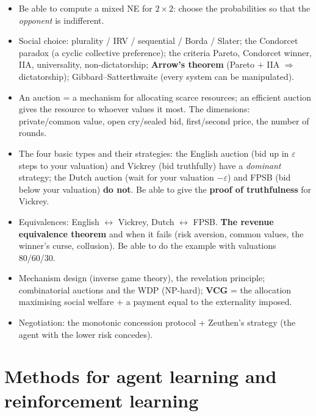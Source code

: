 \documentclass[11pt,a4paper]{article}
\theoremstyle{definition}
\begin{document}
\begin{itemize}
  the only non-Pareto-optimal outcome; $(C,C)$ maximises social welfare. The tragedy of the
  commons. The iterated PD, the shadow of the future, Axelrod and TFT (nice, retaliating,
  forgiving, non-envious, clear).
\item Be able to compute a mixed NE for $2\times2$: choose the probabilities so that the
  \emph{opponent} is indifferent.
\item Social choice: plurality / IRV / sequential / Borda / Slater; the Condorcet paradox
  (a cyclic collective preference); the criteria Pareto, Condorcet winner, IIA, universality,
  non-dictatorship; \textbf{Arrow's theorem} (Pareto + IIA $\Rightarrow$ dictatorship);
  Gibbard--Satterthwaite (every system can be manipulated).
\item An auction = a mechanism for allocating scarce resources; an efficient auction gives the
  resource to whoever values it most. The dimensions: private/common value, open cry/sealed bid,
  first/second price, the number of rounds.
\item The four basic types and their strategies: the English auction (bid up in $\varepsilon$
  steps to your valuation) and Vickrey (bid truthfully) have a \emph{dominant} strategy;
  the Dutch auction (wait for your valuation $-\varepsilon$) and FPSB (bid below your valuation)
  \textbf{do not}. Be able to give the \textbf{proof of truthfulness} for Vickrey.
\item Equivalences: English $\leftrightarrow$ Vickrey, Dutch $\leftrightarrow$ FPSB.
  \textbf{The revenue equivalence theorem} and when it fails (risk aversion, common values, the
  winner's curse, collusion). Be able to do the example with valuations 80/60/30.
\item Mechanism design (inverse game theory), the revelation principle; combinatorial auctions
  and the WDP (NP-hard); \textbf{VCG} = the allocation maximising social welfare + a payment
  equal to the externality imposed.
\item Negotiation: the monotonic concession protocol + Zeuthen's strategy (the agent with the
  lower risk concedes).
\end{itemize}

\section{Methods for agent learning and reinforcement learning}
\label{sec:uceni}
\end{document}

